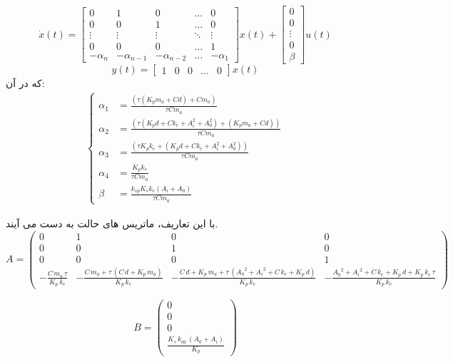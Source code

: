 \[
\dot{x}(t) = 
\begin{bmatrix}
	0 & 1 & 0 & \dots & 0 \\
	0 & 0 & 1 & \dots & 0 \\
	\vdots & \vdots & \vdots & \ddots & \vdots \\
	0 & 0 & 0 & \dots & 1 \\
	-\alpha_n & -\alpha_{n-1} & -\alpha_{n-2} & \dots & -\alpha_1
\end{bmatrix}
x(t)
+
\begin{bmatrix}
	0 \\
	0 \\
	\vdots \\
	0 \\
	\beta
\end{bmatrix}
u(t)
\]
\[
y(t) = 
\begin{bmatrix}
	1 & 0 & 0 & \dots & 0
\end{bmatrix}
x(t)
\]
که در آن:
\[
\begin{aligned}
	\left\{
	\begin{aligned}
		\alpha_1 &= \frac{\left( \tau (K_p m_a + C d) + C m_a \right)}{\tau C m_a} \\
		\alpha_2 &= \frac{\left( \tau (K_p d + C k_e + A_i^2 + A_0^2) + (K_p m_a + C d) \right)}{\tau C m_a} \\
		\alpha_3 &= \frac{\left( \tau K_p k_e + (K_p d + C k_e + A_i^2 + A_0^2) \right)}{\tau C m_a} \\
		\alpha_4 &= \frac{K_p k_e}{\tau C m_a} \\
		\beta &= \frac{k_{sp} K_s k_e (A_i + A_0)}{\tau C m_a}
	\end{aligned} \right. 
\end{aligned}
\]

با این تعاریف، ماتریس های حالت به دست می آیند.
\[
A = \left(\begin{array}{cccc}
	0 & 1 & 0 & 0\\
	0 & 0 & 1 & 0\\
	0 & 0 & 0 & 1\\
	-\frac{C\,m_a \,\tau }{K_p \,k_e } & -\frac{C\,m_a +\tau \,{\left(C\,d+K_p \,m_a \right)}}{K_p \,k_e } & -\frac{C\,d+K_p \,m_a +\tau \,{\left({A_0 }^2 +{A_i }^2 +C\,k_e +K_p \,d\right)}}{K_p \,k_e } & -\frac{{A_0 }^2 +{A_i }^2 +C\,k_e +K_p \,d+K_p \,k_e \,\tau }{K_p \,k_e }
\end{array}\right)
\]

\[
B = \left(\begin{array}{c}
	0\\
	0\\
	0\\
	\frac{K_s \,k_{\textrm{sp}} \,{\left(A_0 +A_i \right)}}{K_p }
\end{array}\right)
\]

